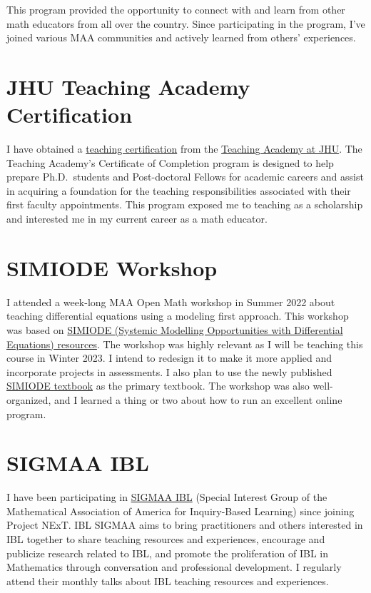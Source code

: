 \documentclass[
]{report}
\begin{document}
This program provided the opportunity to connect with and learn from other math educators from all over the country.
Since participating in the program, I've joined various MAA communities and actively learned from others' experiences.

\hypertarget{jhu-teaching-academy-certification}{%
\section{JHU Teaching Academy Certification}\label{jhu-teaching-academy-certification}}

I have obtained a \href{https://ctei.jhu.edu/teaching-academy/coc}{teaching certification} from the
\href{https://ctei.jhu.edu/teaching-academy}{Teaching Academy at JHU}.
The Teaching Academy's Certificate of Completion program is designed to help prepare Ph.D.~students and Post-doctoral Fellows for academic careers and assist in acquiring a foundation for the teaching responsibilities associated with their first faculty appointments. This program exposed me to teaching as a scholarship and interested me in my current career as a math educator.

\hypertarget{simiode-workshop}{%
\section{SIMIODE Workshop}\label{simiode-workshop}}

I attended a week-long MAA Open Math workshop in Summer 2022 about teaching differential equations using a modeling first approach. This workshop was based on \href{https://qubeshub.org/community/groups/simiode}{SIMIODE (Systemic Modelling Opportunities with Differential Equations) resources}. The workshop was highly relevant as I will be teaching this course in Winter 2023. I intend to redesign it to make it more applied and incorporate projects in assessments. I also plan to use the newly published \href{https://qubeshub.org/community/groups/simiode/textbook}{SIMIODE textbook} as the primary textbook.
The workshop was also well-organized, and I learned a thing or two about how to run an excellent online program.

\hypertarget{sigmaa-ibl}{%
\section{SIGMAA IBL}\label{sigmaa-ibl}}

I have been participating in \href{http://sigmaa.maa.org/ibl/}{SIGMAA IBL} (Special Interest Group of the Mathematical Association of America for Inquiry-Based Learning) since joining Project NExT.
IBL SIGMAA aims to bring practitioners and others interested in IBL together to share teaching resources and experiences, encourage and publicize research related to IBL, and promote the proliferation of IBL in Mathematics through conversation and professional development.
I regularly attend their monthly talks about IBL teaching resources and experiences.
\end{document}
